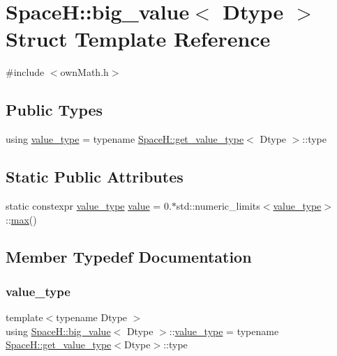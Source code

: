 \hypertarget{struct_space_h_1_1big__value}{}\section{SpaceH\+:\+:big\+\_\+value$<$ Dtype $>$ Struct Template Reference}
\label{struct_space_h_1_1big__value}


{\ttfamily \#include $<$own\+Math.\+h$>$}

\subsection*{Public Types}
\begin{DoxyCompactItemize}
\item 
using \mbox{\hyperlink{struct_space_h_1_1big__value_a8c1a5da25377f513b626b99b2c9e4e54}{value\+\_\+type}} = typename \mbox{\hyperlink{struct_space_h_1_1get__value__type}{Space\+H\+::get\+\_\+value\+\_\+type}}$<$ Dtype $>$\+::type
\end{DoxyCompactItemize}
\subsection*{Static Public Attributes}
\begin{DoxyCompactItemize}
\item 
static constexpr \mbox{\hyperlink{struct_space_h_1_1big__value_a8c1a5da25377f513b626b99b2c9e4e54}{value\+\_\+type}} \mbox{\hyperlink{struct_space_h_1_1big__value_a3191cef28acf20e7770b64e273802dda}{value}} = 0.$\ast$std\+::numeric\+\_\+limits$<$\mbox{\hyperlink{struct_space_h_1_1big__value_a8c1a5da25377f513b626b99b2c9e4e54}{value\+\_\+type}}$>$\+::\mbox{\hyperlink{namespace_space_h_aacd80a06ba9a8b2381301a3917d79cbe}{max}}()
\end{DoxyCompactItemize}


\subsection{Member Typedef Documentation}
\mbox{\label{struct_space_h_1_1big__value_a8c1a5da25377f513b626b99b2c9e4e54}} 
\subsubsection{\texorpdfstring{value\+\_\+type}{value\_type}}
{\footnotesize\ttfamily template$<$typename Dtype $>$ \\
using \mbox{\hyperlink{struct_space_h_1_1big__value}{Space\+H\+::big\+\_\+value}}$<$ Dtype $>$\+::\mbox{\hyperlink{struct_space_h_1_1big__value_a8c1a5da25377f513b626b99b2c9e4e54}{value\+\_\+type}} =  typename \mbox{\hyperlink{struct_space_h_1_1get__value__type}{Space\+H\+::get\+\_\+value\+\_\+type}}$<$Dtype$>$\+::type}



